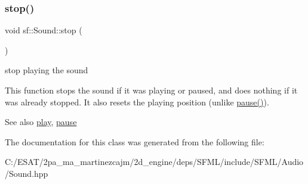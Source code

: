 \subsubsection{\texorpdfstring{stop()}{stop()}}
{\footnotesize\ttfamily void sf\+::\+Sound\+::stop (\begin{DoxyParamCaption}{ }\end{DoxyParamCaption})}



stop playing the sound 

This function stops the sound if it was playing or paused, and does nothing if it was already stopped. It also resets the playing position (unlike \hyperlink{classsf_1_1_sound_a5eeb25815bfa8cdc4a6cc000b7b19ad5}{pause()}).

\begin{DoxySeeAlso}{See also}
\hyperlink{classsf_1_1_sound_a2953ffe632536e72e696fd880ced2532}{play}, \hyperlink{classsf_1_1_sound_a5eeb25815bfa8cdc4a6cc000b7b19ad5}{pause} 
\end{DoxySeeAlso}


The documentation for this class was generated from the following file\+:\begin{DoxyCompactItemize}
\item 
C\+:/\+E\+S\+A\+T/2pa\+\_\+ma\+\_\+martinezcajm/2d\+\_\+engine/deps/\+S\+F\+M\+L/include/\+S\+F\+M\+L/\+Audio/Sound.\+hpp\end{DoxyCompactItemize}
